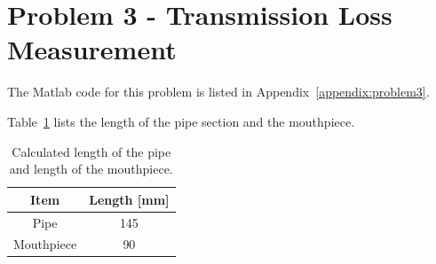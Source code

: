 {\begin{figure}[htb!]
\end{figure}






\newpage
\section*{Problem 3 - Transmission Loss Measurement}


\vspace{-0.25cm}
The Matlab code for this problem is listed in Appendix~\ref{appendix:problem3}.

\vspace{0.25cm}
Table~\ref{table:mouthpieceAndPip} lists the length of the pipe section and the mouthpiece.

\setlength{\abovecaptionskip}{0pt}
\vspace{0.1cm}
{\renewcommand{\arraystretch}{1.5}
\begin{table}[h!]
    \begin{center}
        \small
        \begin{tabular}{ | c | c | }
            \hline
            \textbf{Item}  &  \textbf{Length [mm]}  \\
            \hline
                Pipe  &  145  \\
                \hline
                \rowcolor{Gray}
                Mouthpiece  &  90  \\
            \hline
        \end{tabular}
    \end{center}
    \caption{Calculated length of the pipe and length of the mouthpiece.}
    \label{table:mouthpieceAndPip}
\end{table}


}}
